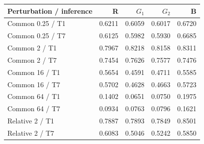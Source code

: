 \begin{inlinetable}
\centering
\caption{Perturbation response gains after 105,000 adaptation iterations. Values 0.25, 2, 16, and 64 denote source-image median intensities (DN), and gains are dimensionless. Relative gains use temporal centering.}\label{tab:gains}
\footnotesize
\setlength{\tabcolsep}{4pt}
\begin{tabular}{lrrrr}
\toprule
Perturbation / inference & R & $G_1$ & $G_2$ & B \\
\midrule
Common 0.25 / T1 & 0.6211 & 0.6059 & 0.6017 & 0.6720 \\
Common 0.25 / T7 & 0.6125 & 0.5982 & 0.5930 & 0.6685 \\
Common 2 / T1 & 0.7967 & 0.8218 & 0.8158 & 0.8311 \\
Common 2 / T7 & 0.7454 & 0.7626 & 0.7577 & 0.7476 \\
Common 16 / T1 & 0.5654 & 0.4591 & 0.4711 & 0.5585 \\
Common 16 / T7 & 0.5702 & 0.4628 & 0.4663 & 0.5723 \\
Common 64 / T1 & 0.1402 & 0.0651 & 0.0750 & 0.1975 \\
Common 64 / T7 & 0.0934 & 0.0763 & 0.0796 & 0.1621 \\
Relative 2 / T1 & 0.7887 & 0.7893 & 0.7849 & 0.8501 \\
Relative 2 / T7 & 0.6083 & 0.5046 & 0.5242 & 0.5850 \\
\bottomrule
\end{tabular}
\end{inlinetable}
